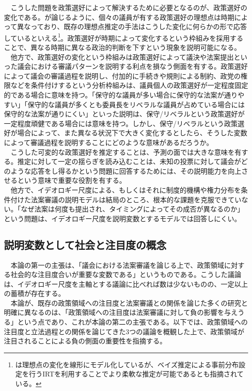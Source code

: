 　こうした問題を政策選好によって解決するために必要となるのが、政策選好の変化である。\citet*{Poole2017-ir}が論じるように、個々の議員が有する政策選好の理想点は時期によって異なっており、既存の理想点推定の手法はこうした変化に何らかの形で応答しているといえる\footnote{\citet*{Poole2017-ir}は理想点の変化を線形にモデル化しているが、ベイズ推定による事前分布設定を行うIRTを利用することでより柔軟な推定が可能であるとも指摘されている。\citep*{Caughey2016-ef}}。政策選好が時期によって変化するという枠組みを採用することで、異なる時期に異なる政治的判断を下すという現象を説明可能になる。\\
　他方で、政策選好の変化という枠組みは政策選好によって議決や法案提出といった議会における審議パターンを説明する利点を損なう側面を有する。政策選好によって議会の審議過程を説明し、付加的に手続きや規則による制約、政党の権限などを条件付けするという分析枠組みは、議員個人の政策選好が一定程度固定的である場合に意味を持つ。「保守的な議員が多い場合に保守的な法案が通りやすい」「保守的な議員が多くとも委員長をリベラルな議員が占めている場合には保守的な法案が通りにくい」といった説明は、保守/リベラルという政策選好が一定程度頑健である場合には意味を持つ。しかし、保守/リベラルという政策選好が場合によって、また異なる状況下で大きく変化するとしたら、そうした変数によって審議過程を説明することにどのような意味があるだろうか。\\
　こうした可変的な政策選好を推定することは、予測の面では大きな意味を有する。推定に対して一定の揺らぎを読み込むことは、未知の投票に対して議会がどのような応答をし得るかという問題に回答するためには、その説明能力を向上させるという意味で重要な役割を有する。\\
　他方で、イデオロギー尺度による、もしくはそれに制度的機構や権力分布を条件付けた法案審議の説明モデルは結局のところ、根本的な課題を克服できていない。「なぜ法案は何度も提出され、タイミングによってその成否が異なるのか」という問題は、イデオロギー尺度を説明変数とするモデルでは回答しにくい。\\

\subsection{説明変数として社会と注目度の概念}
　本論の第一の主張は、「議会における法案審議を論じる上で、政策領域に対する社会的な注目度合いが重要な変数である」というものである。こうした議論は、イデオロギー尺度を主軸とする議論に比べれば数は少ないものの、一定以上の蓄積が存在する。\\
　本論が、既存の政策領域への注目度と法案審議との関係を論じた多くの研究と明確に異なるのは、「政策領域への注目度は法案審議に対して負の影響を与えうる」という点であり、これが本論の第二の主張である。以下では、政策領域への注目度と立法過程との関係を論じてきた3つの議論を概観した上で、政策領域が注目されることによる負の側面の重要性を指摘する。\\

